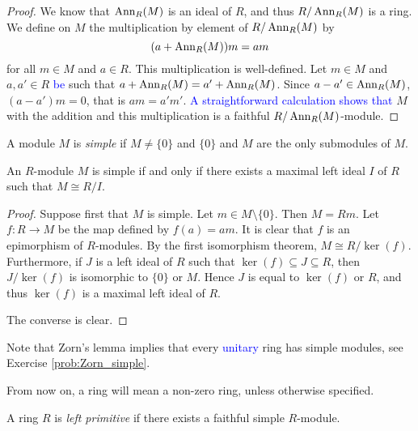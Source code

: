 \begin{proof}
We know that $\operatorname{Ann}_R(M)$ is an ideal of $R$, and thus $R/\operatorname{Ann}_R(M)$ is a ring. 
We define on $M$ the multiplication by element of $R/\operatorname{Ann}_R(M)$ by
\[
(a+\operatorname{Ann}_R(M))m=am
\]
for all $m\in M$ and $a\in R$. This multiplication is well-defined.
Let $m\in M$ and $a,a'\in R$ \textcolor{blue}{be} such that $a+\operatorname{Ann}_R(M)=a'+\operatorname{Ann}_R(M)$.
Since $a-a'\in \operatorname{Ann}_R(M)$, 
$(a-a')m=0$, that is $am=a'm'$. 
\textcolor{blue}{A straightforward calculation shows that} $M$ 
with the addition and this multiplication is a faithful $R/\operatorname{Ann}_R(M)$-module.
\end{proof}

\begin{definition}
A module $M$ is \emph{simple} if $M\neq \{0\}$ and $\{0\}$ and $M$ are the only submodules of $M$.
\end{definition}

\begin{lemma}
\label{Lema 1.1.2}
An $R$-module $M$ is simple if and only if there exists a maximal left ideal $I$ of $R$ such that
$M\cong R/I$.
\end{lemma}

\begin{proof}
Suppose first that $M$ is simple. Let  $m\in M\setminus\{ 0\}$. Then $M=Rm$.
Let $f\colon R\rightarrow M$ be the map defined by $f(a)=am$. 
It is clear that $f$ is an epimorphism of $R$-modules. 
By the first isomorphism theorem, 
$M\cong R/\ker(f)$. 
Furthermore, if $J$ is a left ideal of
$R$ such that $\ker(f)\subseteq J\subseteq R$, then
$J/\ker(f)$ is isomorphic to $\{0\}$ or $M$. Hence $J$ is equal to
$\ker(f)$ or $R$, and thus $\ker(f)$ is a maximal left ideal of $R$.

The converse is clear. 
\end{proof}

Note that Zorn's lemma implies that every \textcolor{blue}{unitary} ring has simple modules, see Exercise \ref{prob:Zorn_simple}. 

\begin{convention}
From now on, a ring will mean a non-zero ring, unless otherwise specified. 
\end{convention}

\begin{definition}
A ring $R$ is \emph{left primitive} if there exists a faithful simple $R$-module. 
\end{definition}


